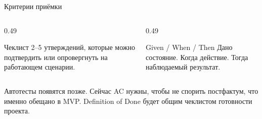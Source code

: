 \begin{frame}{Критерии приёмки}

  \medskip
  \begin{columns}[T]
    \begin{column}{0.49\textwidth}
      \begin{block}{Чеклист}
        2--5 утверждений, которые
        можно подтвердить или опровергнуть
        на работающем сценарии.
      \end{block}
    \end{column}
    \begin{column}{0.49\textwidth}
      \begin{block}{Given / When / Then}
        Дано состояние.
        Когда действие.
        Тогда наблюдаемый результат.
      \end{block}
    \end{column}
  \end{columns}

  \vspace{0.55em}
  {\small
  Автотесты появятся позже. Сейчас AC нужны, чтобы не спорить постфактум,
  что именно обещано в MVP. Definition of Done будет общим чеклистом
  готовности проекта.}
\end{frame}
